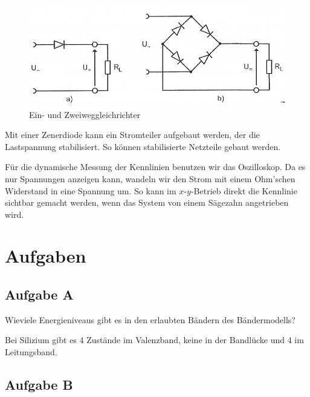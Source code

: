 \begin{figure}[htbp]
	\centering
	\caption{%
		Ein- und Zweiweggleichrichter \cite[Abbildung~2.4]{physik313-Anleitung}
	}
	\label{fig:2-4}
	\includegraphics[width=.7\linewidth]{Bilder_aus_Anleitung/2-4.png}
\end{figure}

Mit einer Zenerdiode kann ein Stromteiler aufgebaut werden, der die
Lastspannung stabilisiert. So können stabilisierte Netzteile gebaut werden.

Für die dynamische Messung der Kennlinien benutzen wir das Oszilloskop. Da es
nur Spannungen anzeigen kann, wandeln wir den Strom mit einem Ohm'schen
Widerstand in eine Spannung um. So kann im $x$-$y$-Betrieb direkt die Kennlinie
sichtbar gemacht werden, wenn das System von einem Sägezahn angetrieben wird.


\FloatBarrier
\section{Aufgaben}

\FloatBarrier
\subsection{Aufgabe A}

\begin{problem}
	Wieviele Energieniveaus gibt es in den erlaubten Bändern des Bändermodells?
\end{problem}

Bei Silizium gibt es 4 Zustände im Valenzband, keine in der Bandlücke und 4 im
Leitungsband. \cite[Vorlesung~16, Folie~13]{meschede/physik441}

\FloatBarrier
\subsection{Aufgabe B}

